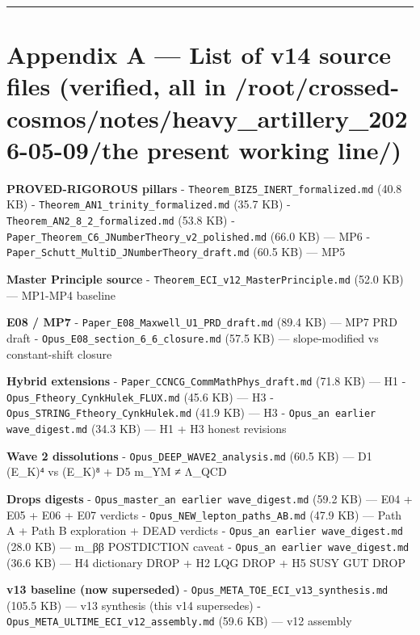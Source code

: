 \documentclass[
  11pt,
  a4paper,
]{article}
\begin{document}
\begin{center}\rule{0.5\linewidth}{0.5pt}\end{center}

\hypertarget{appendix-a-list-of-v14-source-files-verified-all-in-rootcrossed-cosmosnotesheavy_artillery_2026-05-09the present working line}{%
\section{Appendix A --- List of v14 source files (verified, all in /root/crossed-cosmos/notes/heavy\_artillery\_2026-05-09/the present working line/)}\label{appendix-a-list-of-v14-source-files-verified-all-in-rootcrossed-cosmosnotesheavy_artillery_2026-05-09the present working line}}

\textbf{PROVED-RIGOROUS pillars}
- \texttt{Theorem\_BIZ5\_INERT\_formalized.md} (40.8 KB)
- \texttt{Theorem\_AN1\_trinity\_formalized.md} (35.7 KB)
- \texttt{Theorem\_AN2\_8\_2\_formalized.md} (53.8 KB)
- \texttt{Paper\_Theorem\_C6\_JNumberTheory\_v2\_polished.md} (66.0 KB) --- MP6
- \texttt{Paper\_Schutt\_MultiD\_JNumberTheory\_draft.md} (60.5 KB) --- MP5

\textbf{Master Principle source}
- \texttt{Theorem\_ECI\_v12\_MasterPrinciple.md} (52.0 KB) --- MP1-MP4 baseline

\textbf{E08 / MP7}
- \texttt{Paper\_E08\_Maxwell\_U1\_PRD\_draft.md} (89.4 KB) --- MP7 PRD draft
- \texttt{Opus\_E08\_section\_6\_6\_closure.md} (57.5 KB) --- slope-modified vs constant-shift closure

\textbf{Hybrid extensions}
- \texttt{Paper\_CCNCG\_CommMathPhys\_draft.md} (71.8 KB) --- H1
- \texttt{Opus\_Ftheory\_CynkHulek\_FLUX.md} (45.6 KB) --- H3
- \texttt{Opus\_STRING\_Ftheory\_CynkHulek.md} (41.9 KB) --- H3
- \texttt{Opus\_an earlier wave\_digest.md} (34.3 KB) --- H1 + H3 honest revisions

\textbf{Wave 2 dissolutions}
- \texttt{Opus\_DEEP\_WAVE2\_analysis.md} (60.5 KB) --- D1 (E\_K)⁴ vs (E\_K)⁸ + D5 m\_YM ≠ Λ\_QCD

\textbf{Drops digests}
- \texttt{Opus\_master\_an earlier wave\_digest.md} (59.2 KB) --- E04 + E05 + E06 + E07 verdicts
- \texttt{Opus\_NEW\_lepton\_paths\_AB.md} (47.9 KB) --- Path A + Path B exploration + DEAD verdicts
- \texttt{Opus\_an earlier wave\_digest.md} (28.0 KB) --- m\_ββ POSTDICTION caveat
- \texttt{Opus\_an earlier wave\_digest.md} (36.6 KB) --- H4 dictionary DROP + H2 LQG DROP + H5 SUSY GUT DROP

\textbf{v13 baseline (now superseded)}
- \texttt{Opus\_META\_TOE\_ECI\_v13\_synthesis.md} (105.5 KB) --- v13 synthesis (this v14 supersedes)
- \texttt{Opus\_META\_ULTIME\_ECI\_v12\_assembly.md} (59.6 KB) --- v12 assembly
\end{document}
